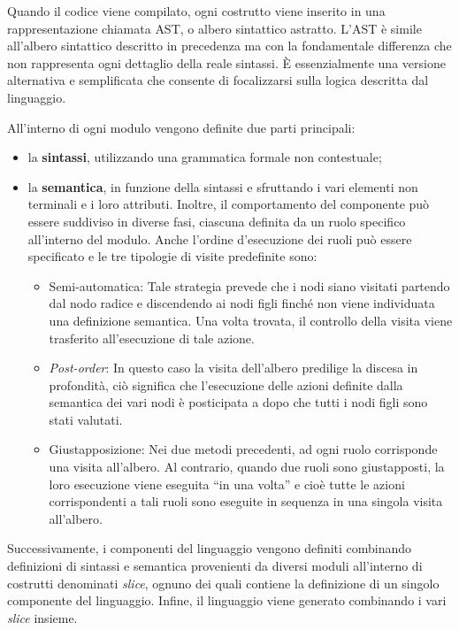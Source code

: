 \documentclass[12pt,a4paper,openright,twoside]{book}
\begin{document}
Quando il codice viene compilato, ogni costrutto viene inserito in una rappresentazione chiamata \ac{AST}, o albero sintattico astratto. 
L'\ac{AST} è simile all'albero sintattico descritto in precedenza ma con la fondamentale differenza che non rappresenta ogni dettaglio della 
reale sintassi. È essenzialmente una versione alternativa e semplificata che consente di focalizzarsi sulla logica descritta dal linguaggio.

All’interno di ogni modulo vengono definite due parti principali:
\begin{itemize}
    \item la \textbf{sintassi}, utilizzando una grammatica formale non contestuale;
    \item la \textbf{semantica}, in funzione della sintassi e sfruttando i vari elementi non terminali e i loro attributi. Inoltre, il 
    comportamento del componente può essere suddiviso in diverse fasi, ciascuna definita da un ruolo specifico all'interno del modulo. Anche 
    l'ordine d'esecuzione dei ruoli può essere specificato e le tre tipologie di visite predefinite sono:
    \begin{itemize}
        \item Semi-automatica: Tale strategia prevede che i nodi siano visitati partendo dal nodo radice e discendendo ai nodi figli finché non 
        viene individuata una definizione semantica. Una volta trovata, il controllo della visita viene trasferito all'esecuzione di tale azione.
        \item \textit{Post-order}: In questo caso la visita dell'albero predilige la discesa in profondità, ciò significa che l'esecuzione delle 
        azioni definite dalla semantica dei vari nodi è posticipata a dopo che tutti i nodi figli sono stati valutati.
        \item Giustapposizione: Nei due metodi precedenti, ad ogni ruolo corrisponde una visita all'albero. Al contrario, quando due ruoli sono 
        giustapposti, la loro esecuzione viene eseguita ``in una volta'' e cioè tutte le azioni corrispondenti a tali ruoli sono eseguite in 
        sequenza in una singola visita all'albero.
    \end{itemize}
\end{itemize}

Successivamente, i componenti del linguaggio vengono definiti combinando definizioni di sintassi e semantica provenienti da diversi moduli 
all’interno di costrutti denominati \textit{slice}, ognuno dei quali contiene la definizione di un singolo componente del linguaggio. 
Infine, il linguaggio viene generato combinando i vari \textit{slice} insieme. \cite{Vacchi2015} 
\end{document}
